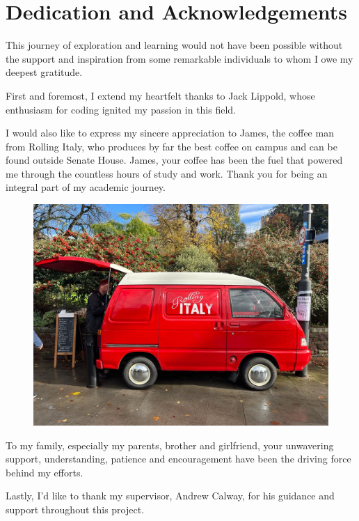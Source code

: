 \chapter*{Dedication and Acknowledgements}
\begin{SingleSpace}
This journey of exploration and learning would not have been possible without the support and inspiration from some remarkable individuals to whom I owe my deepest gratitude.

First and foremost, I extend my heartfelt thanks to Jack Lippold, whose enthusiasm for coding ignited my passion in this field. 

I would also like to express my sincere appreciation to James, the coffee man from Rolling Italy, who produces by far the best coffee on campus and can be found outside Senate House. James, your coffee has been the fuel that powered me through the countless hours of study and work. Thank you for being an integral part of my academic journey.

\begin{figure}
    \centering
    \includegraphics[scale=0.3]{Images/WhatsApp Image 2023-12-06 at 1.11.27 PM.jpeg}
\end{figure}

To my family, especially my parents, brother and girlfriend, your unwavering support, understanding, patience and encouragement have been the driving force behind my efforts.

Lastly, I'd like to thank my supervisor, Andrew Calway, for his guidance and support throughout this project.
\newline    


\end{SingleSpace}
\clearpage
